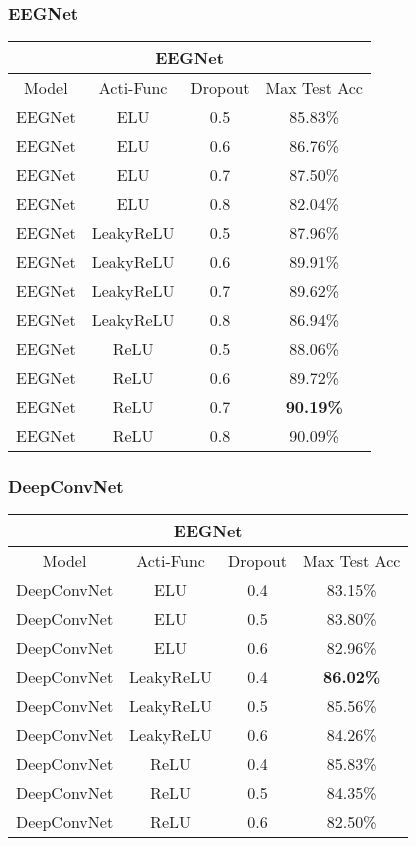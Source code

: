\subsubsection{EEGNet}
\begin{center}
\begin{tabular}{ |c|c|c||c|  }
\hline
\multicolumn{4}{|c|}{EEGNet} \\
\hline
Model & Acti-Func & Dropout & Max Test Acc\\
\hline
EEGNet & ELU & 0.5 & 85.83\% \\
EEGNet & ELU & 0.6 & 86.76\% \\
EEGNet & ELU & 0.7 & 87.50\% \\
EEGNet & ELU & 0.8 & 82.04\% \\
\hline
EEGNet & LeakyReLU & 0.5 & 87.96\% \\
EEGNet & LeakyReLU & 0.6 & 89.91\% \\
EEGNet & LeakyReLU & 0.7 & 89.62\% \\
EEGNet & LeakyReLU & 0.8 & 86.94\% \\
\hline
EEGNet & ReLU & 0.5 & 88.06\% \\
EEGNet & ReLU & 0.6 & 89.72\% \\
EEGNet & ReLU & 0.7 & \textbf{90.19\%} \\
EEGNet & ReLU & 0.8 & 90.09\% \\
\hline
\end{tabular}
\end{center}
\subsubsection{DeepConvNet}
\begin{center}
\begin{tabular}{ |c|c|c||c|  }
\hline
\multicolumn{4}{|c|}{EEGNet} \\
\hline
Model & Acti-Func & Dropout & Max Test Acc\\
\hline
DeepConvNet & ELU & 0.4 & 83.15\% \\
DeepConvNet & ELU & 0.5 & 83.80\% \\
DeepConvNet & ELU & 0.6 & 82.96\% \\
\hline
DeepConvNet & LeakyReLU & 0.4 & \textbf{86.02\%} \\
DeepConvNet & LeakyReLU & 0.5 & 85.56\% \\
DeepConvNet & LeakyReLU & 0.6 & 84.26\% \\
\hline
DeepConvNet & ReLU & 0.4 & 85.83\% \\
DeepConvNet & ReLU & 0.5 & 84.35\% \\
DeepConvNet & ReLU & 0.6 & 82.50\% \\
\hline
\end{tabular}
\end{center}
